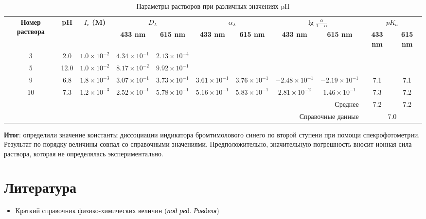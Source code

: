 \documentclass{article}
\begin{document}
	
\begin{table}[htbp]
	\centering
	\caption{Параметры растворов при различных значениях pH}
	\begin{adjustbox}{width=\textwidth}
		\begin{tabular}{ccccccccccc}  %
			\toprule
			\multirow{2}{*}{\textbf{Номер раствора}} & \multirow{2}{*}{\textbf{pH}} & \multirow{2}{*}{\textbf{$I_c$ (M)}} & \multicolumn{2}{c}{\textbf{$D_{\lambda}$}} & \multicolumn{2}{c}{\textbf{$\alpha_{\lambda}$}} & \multicolumn{2}{c}{\textbf{$\lg{\frac{\alpha}{1-\alpha}}$}} & \multicolumn{2}{c}{\textbf{$pK_a$}} \\  
			\cmidrule(lr){4-5} \cmidrule(lr){6-7} \cmidrule(lr){8-9} \cmidrule(lr){10-11}
			&  &  & \textbf{433 \unit{\nano\meter}} & \textbf{615 \unit{\nano\meter}} & \textbf{433 \unit{\nano\meter}} & \textbf{615 \unit{\nano\meter}} & \textbf{433 \unit{\nano\meter}} & \textbf{615 \unit{\nano\meter}} & \textbf{433 \unit{\nano\meter}} & \textbf{615 \unit{\nano\meter}} \\  
			\midrule
			3  & 2.0  & $1.0 \times 10^{-2}$  & $4.34 \times 10^{-1}$ & $2.13 \times 10^{-4}$ & & &  \\ 
			5  & 12.0 & $1.0 \times 10^{-2}$  & $8.17 \times 10^{-2}$ & $9.92 \times 10^{-1}$ & & & & & &  \\ 
			9  & 6.8  & $1.8 \times 10^{-3}$  & $3.07 \times 10^{-1}$ & $3.73 \times 10^{-1}$ & $3.61 \times 10^{-1}$ & $3.76 \times 10^{-1}$ & $-2.48 \times 10^{-1}$ & $-2.19 \times 10^{-1}$ & 7.1 & 7.1 \\  
			10 & 7.3  & $1.2 \times 10^{-3}$  & $2.52 \times 10^{-1}$ & $5.78 \times 10^{-1}$ & $5.16 \times 10^{-1}$ & $5.83 \times 10^{-1}$ & $2.81 \times 10^{-2}$ & $1.46 \times 10^{-1}$ & 7.3 & 7.2 \\  
			\midrule
			\multicolumn{9}{r}{Среднее}  &  7.2 & 7.2 \\  %
			\multicolumn{9}{r}{Справочные данные}  & \multicolumn{2}{c}{7.0}\\  %
			\bottomrule
		\end{tabular}
		\label{tab:pka}
	\end{adjustbox}
\end{table}
\textbf{Итог}: определили значение константы диссоциации индикатора бромтимолового синего по второй ступени при помощи спекрофотометрии. Результат по порядку величины совпал со справочными значениями. Предположительно, значительную погрешность вносит ионная сила раствора, которая не определялась экспериментально.

\pagebreak
\section{Литература}
\begin{itemize}
	\item Краткий справочник физико-химических величин (\textit{под ред. Равделя})
\end{itemize}
\end{document}
